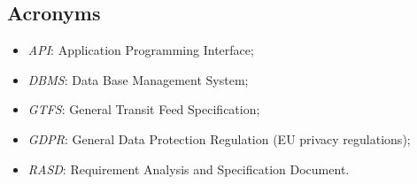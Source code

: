 \subsection{Acronyms}
	\begin{itemize}
	\item \textit{API}: Application Programming Interface;
	\item \textit{DBMS}: Data Base Management System;
	\item \textit{GTFS}: General Transit Feed Specification;
	\item \textit{GDPR}: General Data Protection Regulation (EU privacy regulations);
	\item \textit{RASD}: Requirement Analysis and Specification Document.
	\end{itemize}